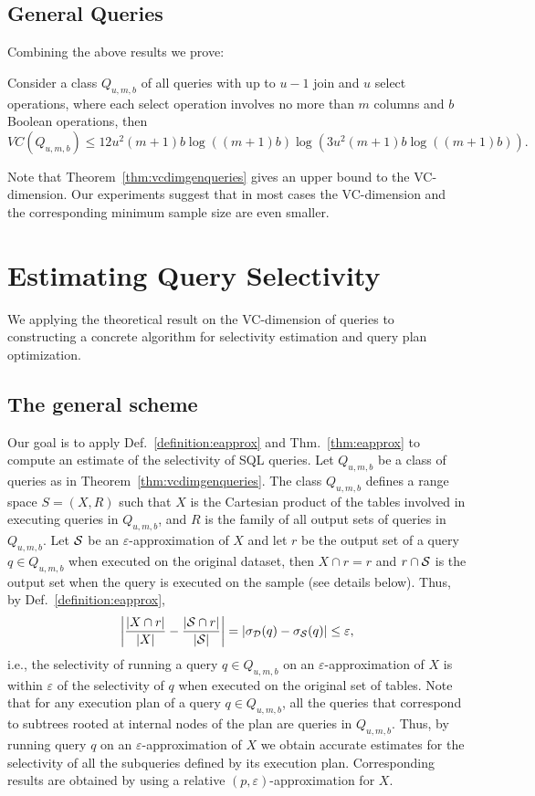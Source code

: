 \subsection{General Queries}\label{sec:vcdimgenqueries}
Combining the above results we prove:
\begin{theorem}\label{thm:vcdimgenqueries}
Consider a class $Q_{u,m,b}$ of all queries with up to $u-1$ join and $u$ select
operations, where each select operation involves no more than $m$ columns and $b$
Boolean operations, then 
\[
VC(Q_{u,m,b}) \leq
12u^2(m+1)b\log((m+1)b)\log(3u^2(m+1)b\log((m+1)b)).\]
\end{theorem}

Note that Theorem~\ref{thm:vcdimgenqueries} gives an upper bound to the
VC-dimension. Our experiments suggest that in most cases the VC-dimension and
the corresponding minimum sample size are even smaller.

\section{Estimating Query Selectivity}\label{sec:applications}
We applying the theoretical result on the VC-dimension of queries 
to constructing a concrete
algorithm for selectivity estimation and query plan optimization.

\subsection{The general scheme}
Our goal is to apply Def.~\ref{definition:eapprox} and Thm.~\ref{thm:eapprox} to
compute an estimate of the selectivity of SQL queries. Let $Q_{u,m,b}$ be a
class of queries as in Theorem~\ref{thm:vcdimgenqueries}.
The class $Q_{u,m,b}$ defines a range space $S=(X,R)$ such that $X$ is the
Cartesian product of the tables involved in executing queries in $Q_{u,m,b}$,
and $R$ is the family of all output sets of queries in $Q_{u,m,b}$. 
Let ${\cal S}$ be an $\varepsilon$-approximation of $X$ and
let $r$ be the output set
of a query $q\in Q_{u,m,b}$ when executed on the original dataset, then $X\cap
r=r$ and $r\cap {\cal S}$ is the output set when the query is executed on the sample
(see details below). Thus, by Def.~\ref{definition:eapprox},
\[
\left|\frac{|X\cap r|}{|X|} - \frac{|{\cal S}\cap r|}{|{\cal S}|}\right|=
|\sigma_{\cal D}(q)-\sigma_{\cal S}(q)| \le\varepsilon,
\]
i.e., the selectivity of running a query $q\in Q_{u,m,b}$ on an $\varepsilon$-approximation of $X$ 
is
within $\varepsilon$ of the selectivity of $q$ when executed on the original set of tables.
Note that for any execution plan of a query $q\in Q_{u,m,b}$, all the queries
that correspond to subtrees rooted at internal nodes of the plan are queries in
$Q_{u,m,b}$. Thus, by running query $q$ on an $\varepsilon$-approximation of $X$ we obtain accurate
estimates for the selectivity of all the subqueries defined by its execution
plan. Corresponding results are obtained by using a relative
  $(p,\varepsilon)$-approximation for $X$.
  
